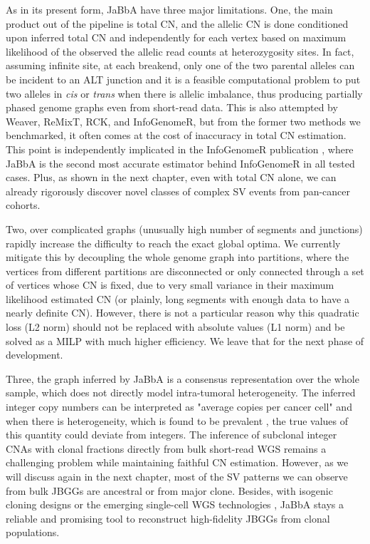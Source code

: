 \documentclass[phd,tocprelim]{cornell}
\begin{document}
As in its present form, JaBbA have three major limitations. One, the main product out of the pipeline is total CN, and the allelic CN is done conditioned upon inferred total CN and independently for each vertex based on maximum likelihood of the observed the allelic read counts at heterozygosity sites. In fact, assuming infinite site, at each breakend, only one of the two parental alleles can be incident to an ALT junction and it is a feasible computational problem to put two alleles in \textit{cis} or \textit{trans} when there is allelic imbalance, thus producing partially phased genome graphs even from short-read data. This is also attempted by Weaver, ReMixT, RCK, and InfoGenomeR, but from the former two methods we benchmarked, it often comes at the cost of inaccuracy in total CN estimation. This point is independently implicated in the InfoGenomeR publication \cite{Lee2021-rl}, where JaBbA is the second most accurate estimator behind InfoGenomeR in all tested cases. Plus, as shown in the next chapter, even with total CN alone, we can already rigorously discover novel classes of complex SV events from pan-cancer cohorts.

Two, over complicated graphs (unusually high number of segments and junctions) rapidly increase the difficulty to reach the exact global optima. We currently mitigate this by decoupling the whole genome graph into partitions, where the vertices from different partitions are disconnected or only connected through a set of vertices whose CN is fixed, due to very small variance in their maximum likelihood estimated CN (or plainly, long segments with enough data to have a nearly definite CN). However, there is not a particular reason why this quadratic loss (L2 norm) should not be replaced with absolute values (L1 norm) and be solved as a MILP with much higher efficiency. We leave that for the next phase of development.

Three, the graph inferred by JaBbA is a consensus representation over the whole sample, which does not directly model intra-tumoral heterogeneity. The inferred integer copy numbers can be interpreted as "average copies per cancer cell" and when there is heterogeneity, which is found to be prevalent \cite{Watkins2020-qp}, the true values of this quantity could deviate from integers. The inference of subclonal integer CNAs with clonal fractions directly from bulk short-read WGS remains a challenging problem \cite{McPherson2017-ry} while maintaining faithful CN estimation. However, as we will discuss again in the next chapter, most of the SV patterns we can observe from bulk JBGGs are ancestral or from major clone. Besides, with isogenic cloning designs \cite{Dewhurst2021-jk} or the emerging single-cell WGS technologies \cite{Zahn2017-re,laks2019,Salehi2021-xi}, JaBbA stays a reliable and promising tool to reconstruct high-fidelity JBGGs from clonal populations.
\end{document}

